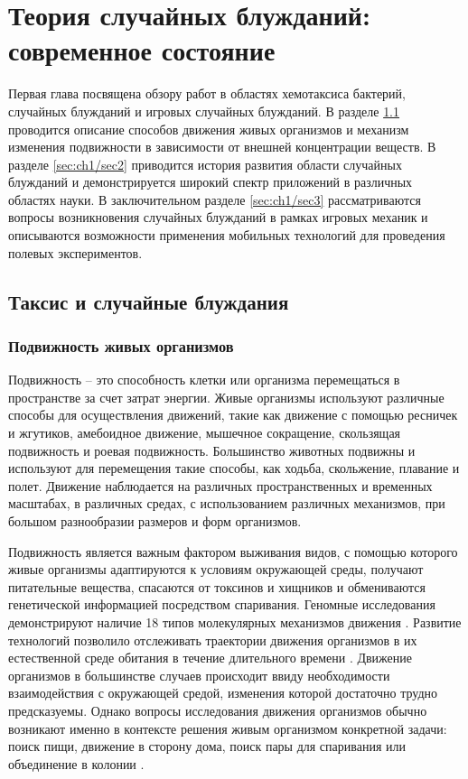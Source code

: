 \chapter{Теория случайных блужданий: современное состояние}\label{ch:ch1}

Первая глава посвящена обзору работ в областях хемотаксиса бактерий, случайных блужданий и игровых случайных блужданий. В разделе \cref{sec:ch1/sec1} проводится описание способов движения живых организмов и механизм изменения подвижности в зависимости от внешней концентрации веществ. В разделе \cref{sec:ch1/sec2} приводится история развития области случайных блужданий и демонстрируется широкий спектр приложений в различных областях науки. В заключительном разделе \cref{sec:ch1/sec3} рассматриваются вопросы возникновения случайных блужданий в рамках игровых механик и описываются возможности применения мобильных технологий для проведения полевых экспериментов.

\section{Таксис и случайные блуждания}\label{sec:ch1/sec1}

\subsection{Подвижность живых организмов}\label{subsec:ch1/sec1/sub1}

Подвижность -- это способность клетки или организма перемещаться в пространстве за счет затрат энергии. Живые организмы используют различные способы для осуществления движений, такие как движение с помощью ресничек и жгутиков, амебоидное движение, мышечное сокращение, скользящая подвижность и роевая подвижность. Большинство животных подвижны и используют для перемещения такие способы, как ходьба, скольжение, плавание и полет. Движение наблюдается на различных пространственных и временных масштабах, в различных средах, с использованием различных механизмов, при большом разнообразии размеров и форм организмов. 

Подвижность является важным фактором выживания видов, с помощью которого живые организмы адаптируются к условиям окружающей среды, получают питательные вещества, спасаются от токсинов и хищников и обмениваются генетической информацией посредством спаривания. Геномные исследования демонстрируют наличие 18 типов молекулярных механизмов движения \cite{miyata_tree_2020}. Развитие технологий позволило отслеживать траектории движения организмов в их естественной среде обитания в течение длительного времени \cite{boyer_modelling_2010}. Движение организмов в большинстве случаев происходит ввиду необходимости взаимодействия с окружающей средой, изменения которой достаточно трудно предсказуемы. Однако вопросы исследования движения организмов обычно возникают именно в контексте решения живым организмом конкретной задачи: поиск пищи, движение в сторону дома, поиск пары для спаривания или объединение в колонии \cite{zaburdaev_levy_2015}. 


